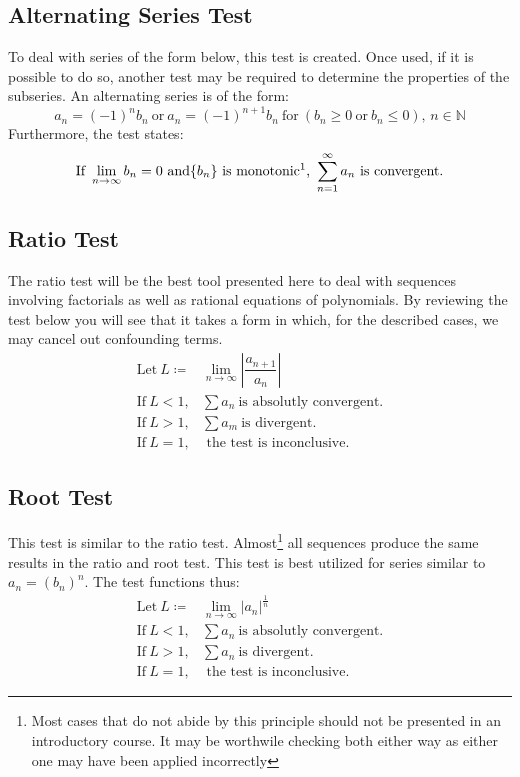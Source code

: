 \documentclass[11pt]{article}
\newcommand{\define}{\coloneqq}
\begin{document}
	\subsection*{Alternating Series Test}
		To deal with series of the form below, this test is created. Once used, if it is possible to do so, another test may be required
		to determine the properties of the subseries. An alternating series is of the form:
			\begin{equation}
				a_n=(-1)^{n}b_n \ \text{or} \ a_n=(-1)^{n+1}b_n \ \text{for} \ (b_n \geq 0 \ \text{or} \ b_n \leq 0),\,n\in\mathbb{N}
			\end{equation}
		Furthermore, the test states:
			\begin{gather}
				\text{If} \ \lim_{n\to\infty} b_n = 0 \ \text{and} \{b_n\} \ \text{is monotonic\footnotemark,} \ \sum_{n=1}^{\infty} a_n \ \text{is convergent.}
			\end{gather}

	\subsection*{Ratio Test}
		The ratio test will be the best tool presented here to deal with sequences involving factorials as well as rational equations of polynomials.
		By reviewing the test below you will see that it takes a form in which, for the described cases, we may cancel out confounding terms.
			\begin{align}
				\text{Let} \ L \define &\lim_{n\to\infty} \left| \dfrac{a_{n+1}}{a_n} \right| \\
				\text{If} \ L < 1, &\sum a_n \ \text{is absolutly convergent.} \\
				\text{If} \ L > 1, &\sum a_m \ \text{is divergent.} \\
				\text{If} \ L = 1, &\text{ the test is inconclusive.}
			\end{align}

	\subsection*{Root Test}
		This test is similar to the ratio test. Almost\footnote{Most cases that do not abide by this principle should not be presented
		in an introductory course. It may be worthwile checking both either way as either one may have been applied incorrectly} 
		all sequences produce the same results in the ratio and root test. This test is best utilized for series similar to
		$a_n = (b_n)^n$. The test functions thus:
			\begin{align}
				\text{Let} \ L \define &\lim_{n\to\infty} \left| a_n \right|^{\frac{1}{n}} \\
				\text{If} \ L < 1, &\sum a_n \ \text{is absolutly convergent.} \\
				\text{If} \ L > 1, &\sum a_n \ \text{is divergent.} \\
				\text{If} \ L = 1, &\text{ the test is inconclusive.}
			\end{align}
\end{document}
